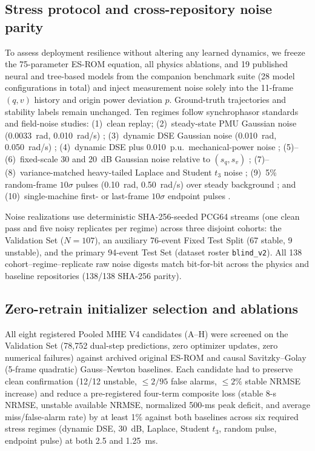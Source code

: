 \documentclass[journal]{IEEEtran}
\begin{document}
\subsection{Stress protocol and cross-repository noise parity}
To assess deployment resilience without altering any learned dynamics, we
freeze the 75-parameter ES-ROM equation, all physics ablations, and 19
published neural and tree-based models from the companion benchmark suite
(28 model configurations in total) and inject measurement noise solely into
the 11-frame \((q,v)\) history and origin power deviation \(p\). Ground-truth
trajectories and stability labels remain unchanged. Ten regimes follow
synchrophasor standards and field-noise studies: (1)~clean replay;
(2)~steady-state PMU Gaussian noise (0.0033~rad, 0.010~rad/s)
\cite{ieee60255_2018,brown2016pmu}; (3)~dynamic DSE Gaussian noise
(0.010~rad, 0.050~rad/s) \cite{ieee60255_2018,singh2014dynamic,ghahremani2011dynamic};
(4)~dynamic DSE plus 0.010~p.u.\ mechanical-power noise
\cite{ghahremani2011dynamic,singh2014dynamic}; (5)--(6)~fixed-scale 30 and
20~dB Gaussian noise relative to \((s_q,s_v)\)
\cite{yu2018intelligent,chen2021adaptive}; (7)--(8)~variance-matched
heavy-tailed Laplace and Student \(t_3\) noise
\cite{wang2018pmu,zhao2017robust}; (9)~5\% random-frame \(10\sigma\) pulses
(0.10~rad, 0.50~rad/s) over steady background \cite{zhao2017robust}; and
(10)~single-machine first- or last-frame \(10\sigma\) endpoint pulses
\cite{zhao2017robust}.

Noise realizations use deterministic SHA-256-seeded PCG64 streams (one clean
pass and five noisy replicates per regime) across three disjoint cohorts: the
Validation Set (\(N=107\)), an auxiliary 76-event Fixed Test Split (67 stable,
9 unstable), and the primary 94-event Test Set (dataset roster
\texttt{blind\_v2}). All 138 cohort--regime--replicate raw noise digests
match bit-for-bit across the physics and baseline repositories (138/138
SHA-256 parity).

\subsection{Zero-retrain initializer selection and ablations}
All eight registered Pooled MHE V4 candidates (A--H) were screened on the
Validation Set (78,752 dual-step predictions, zero optimizer updates, zero
numerical failures) against archived original ES-ROM and causal
Savitzky--Golay (5-frame quadratic) Gauss--Newton baselines. Each candidate
had to preserve clean confirmation (12/12 unstable, \(\le2/95\) false alarms,
\(\le2\%\) stable NRMSE increase) and reduce a pre-registered four-term
composite loss (stable 8-s NRMSE, unstable available NRMSE, normalized 500-ms
peak deficit, and average miss/false-alarm rate) by at least 1\% against both
baselines across six required stress regimes (dynamic DSE, 30~dB, Laplace,
Student \(t_3\), random pulse, endpoint pulse) at both 2.5 and 1.25~ms.
\end{document}
